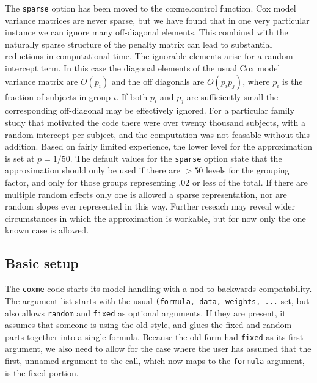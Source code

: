 \documentclass{article}
\begin{document}
The \Verb!sparse! option has been moved to the coxme.control function.
Cox model variance matrices are never sparse, but we have found that
in one very particular instance we can ignore many off-diagonal
elements.  This combined with the naturally sparse structure of
the penalty matrix can lead to substantial reductions in
computational time.  
The ignorable elements arise for a random intercept term.  In this case
the diagonal elements of the usual Cox model variance matrix
are $O(p_i)$ and the off diagonals are $O(p_i p_j)$, where $p_i$ is
the fraction of subjects in group $i$.
If both $p_i$ and $p_j$ are sufficiently small the corresponding
off-diagonal may be effectively ignored.
For a particular family study that motivated the code there were
over twenty thousand subjects, with a random intercept per subject, and
the computation was not feasable without this addition.
Based on fairly limited experience, the lower level for the
approximation is set at $p= 1/50$.  
The default values for the \Verb!sparse! option state that the approximation
should only be used if there are $>50$ levels for the grouping factor, and
only for those groups representing .02 or less of the total.
If there are multiple random effects only one is allowed a sparse
representation, nor are random slopes ever represented in this way.
Further reseach may reveal wider circumstances in which the approximation
is workable, but for now only the one known case is allowed.



\subsection{Basic setup}
The \Verb!coxme! code starts its model handling with a nod to backwards
compatability.
The argument list starts with the usual \Verb!(formula, data, weights, ...!
set, but also allows \Verb!random! and \Verb?fixed? as optional arguments.
If they are present, it assumes that someone is using the old style,
and glues the fixed and random parts together into a single formula.
Because the old form had \Verb!fixed! as its first argument, we also
need to allow for the case where the user has assumed that the first,
unnamed argument to the call, which now maps to the \Verb!formula!
argument, is the fixed portion.
\end{document}
